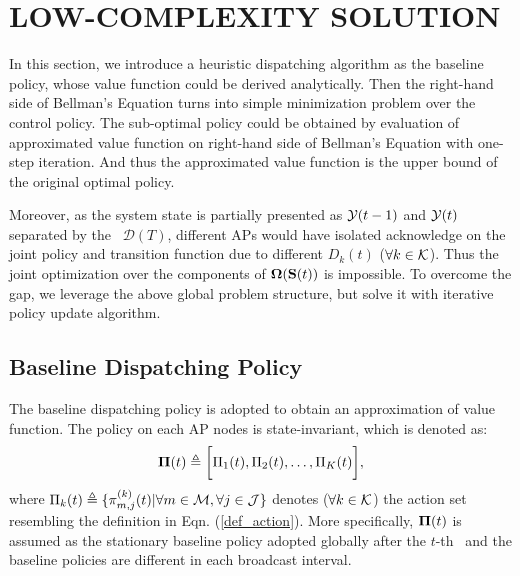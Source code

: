 \section{LOW-COMPLEXITY SOLUTION}
In this section, we introduce a heuristic dispatching algorithm as the baseline policy, whose value function could be derived analytically.
Then the right-hand side of Bellman's Equation turns into simple minimization problem over the control policy. The sub-optimal policy could be obtained by evaluation of approximated value function on right-hand side of Bellman's Equation with one-step iteration. And thus the approximated value function is the upper bound of the original optimal policy.

Moreover, as the system state is partially presented as $\mathcal{Y}({t-1})$ and $\mathcal{Y}({t})$ separated by the \brdelay~$\mathcal{D}(T)$, different APs would have isolated acknowledge on the joint policy and transition function due to different $D_k(t)$ ($\forall k\in\mathcal{K}$).
Thus the joint optimization over the components of $\boldsymbol{\Omega}(\mathbf{S}({t}))$ is impossible.
To overcome the gap, we leverage the above global problem structure, but solve it with iterative policy update algorithm.


\subsection{Baseline Dispatching Policy}
The baseline dispatching policy is adopted to obtain an approximation of value function. The policy on each AP nodes is state-invariant, which is denoted as:
\begin{align}
    \boldsymbol{\Pi}({t}) \triangleq \bigg[\Pi_1({t}), \Pi_2({t}), \dots, \Pi_K({t})\bigg],
\end{align}
where $\Pi_k({t}) \triangleq \{\pi^{(k)}_{m,j}({t}) | \forall m\in\mathcal{M},\forall j\in\mathcal{J}\}$ denotes ($\forall k\in\mathcal{K}$) the action set resembling the definition in Eqn. (\ref{def_action}).
More specifically, $\boldsymbol{\Pi}(t)$ is assumed as the stationary baseline policy adopted globally after the $t$-th \brpoint~and the baseline policies are different in each broadcast interval.

